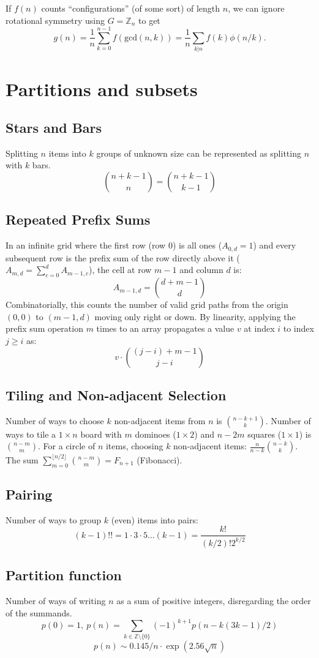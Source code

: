 		 If $f(n)$ counts ``configurations'' (of some sort) of length $n$, we can ignore rotational symmetry using $G = \mathbb Z_n$ to get
		 \[ g(n) = \frac 1 n \sum_{k=0}^{n-1}{f(\text{gcd}(n, k))} = \frac 1 n \sum_{k|n}{f(k)\phi(n/k)}. \]

\section{Partitions and subsets}
	\subsection{Stars and Bars}
		Splitting $n$ items into $k$ groups of unknown size can be represented as splitting $n$ with $k$ bars.
		$$\binom{n+k-1}{n} = \binom{n+k-1}{k-1}$$

	\subsection{Repeated Prefix Sums}
		In an infinite grid where the first row (row $0$) is all ones ($A_{0, d} = 1$) and every subsequent row is the prefix sum of the row directly above it ($A_{m, d} = \sum_{c=0}^d A_{m-1, c}$), the cell at row $m-1$ and column $d$ is:
		$$A_{m-1, d} = \binom{d + m - 1}{d}$$
		Combinatorially, this counts the number of valid grid paths from the origin $(0,0)$ to $(m-1, d)$ moving only right or down.
		By linearity, applying the prefix sum operation $m$ times to an array propagates a value $v$ at index $i$ to index $j \ge i$ as:
		$$v \cdot \binom{(j-i) + m - 1}{j-i}$$

	\subsection{Tiling and Non-adjacent Selection}
		Number of ways to choose $k$ non-adjacent items from $n$ is $\binom{n-k+1}{k}$.
		Number of ways to tile a $1 \times n$ board with $m$ dominoes ($1 \times 2$) and $n-2m$ squares ($1 \times 1$) is $\binom{n-m}{m}$.
		For a circle of $n$ items, choosing $k$ non-adjacent items: $\frac{n}{n-k}\binom{n-k}{k}$.
		The sum $\sum_{m=0}^{\lfloor n/2 \rfloor} \binom{n-m}{m} = F_{n+1}$ (Fibonacci).
	\subsection{Pairing}
		Number of ways to group $k$ (even) items into pairs:
		$$(k-1)!! = 1 \cdot 3 \cdot 5 \dots (k-1) = \frac{k!}{(k/2)! 2^{k/2}}$$
	\subsection{Partition function}
		Number of ways of writing $n$ as a sum of positive integers, disregarding the order of the summands.
		\[ p(0) = 1,\ p(n) = \sum_{k \in \mathbb Z \setminus \{0\}}{(-1)^{k+1} p(n - k(3k-1) / 2)} \]
		\[ p(n) \sim 0.145 / n \cdot \exp(2.56 \sqrt{n}) \]

